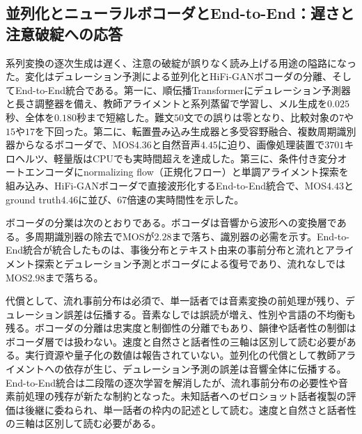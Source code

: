 \documentclass[lualatex,a4paper,10pt]{jlreq}
\begin{document}
\subsection{並列化とニューラルボコーダとEnd-to-End：遅さと注意破綻への応答}
系列変換の逐次生成は遅く、注意の破綻が誤りなく読み上げる用途の隘路になった\autocite{btd054}。変化はデュレーション予測による並列化とHiFi-GANボコーダの分離、そしてEnd-to-End統合である\autocite{btd054,btd055,btd056}。第一に、順伝播Transformerにデュレーション予測器と長さ調整器を備え、教師アライメントと系列蒸留で学習し、メル生成を$0.025$秒、全体を$0.180$秒まで短縮した\autocite{btd054}。難文$50$文での誤りは零となり、比較対象の$7$や$15$や$17$を下回った\autocite{btd054}。第二に、転置畳み込み生成器と多受容野融合、複数周期識別器からなるボコーダで、MOS$4.36$と自然音声$4.45$に迫り、画像処理装置で$3701$キロヘルツ、軽量版はCPUでも実時間超えを達成した\autocite{btd055}。第三に、条件付き変分オートエンコーダにnormalizing flow（正規化フロー）と単調アライメント探索を組み込み、HiFi-GANボコーダで直接波形化するEnd-to-End統合で、MOS$4.43$とground truth$4.46$に並び、$67$倍速の実時間性を示した\autocite{btd056}。

ボコーダの分業は次のとおりである。ボコーダは音響から波形への変換層である\autocite{btd055}。多周期識別器の除去でMOSが$2.28$まで落ち、識別器の必需を示す\autocite{btd055}。End-to-End統合が統合したものは、事後分布とテキスト由来の事前分布と流れとアライメント探索とデュレーション予測とボコーダによる復号であり、流れなしではMOS$2.98$まで落ちる\autocite{btd056}。

代償として、流れ事前分布は必須で、単一話者では音素変換の前処理が残り、デュレーション誤差は伝播する\autocite{btd056}。音素なしでは誤読が増え、性別や言語の不均衡も残る\autocite{btd056}。ボコーダの分離は忠実度と制御性の分離でもあり、韻律や話者性の制御はボコーダ層では扱わない\autocite{btd055}。速度と自然さと話者性の三軸は区別して読む必要がある\autocite{btd054,btd055,btd056}。実行資源や量子化の数値は報告されていない\autocite{btd054,btd055}。並列化の代償として教師アライメントへの依存が生じ、デュレーション予測の誤差は音響全体に伝播する\autocite{btd054}。End-to-End統合は二段階の逐次学習を解消したが、流れ事前分布の必要性や音素前処理の残存が新たな制約となった\autocite{btd056}。未知話者へのゼロショット話者複製の評価は後継に委ねられ、単一話者の枠内の記述として読む\autocite{btd056}。速度と自然さと話者性の三軸は区別して読む必要がある\autocite{btd054,btd055,btd056}。
\end{document}
